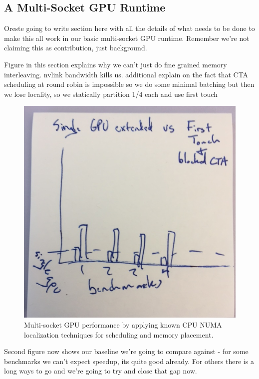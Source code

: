\subsection{A Multi-Socket GPU Runtime}

Oreste going to write section here with all the details of what needs to be done
to make this all work in our basic multi-socket GPU runtime.  Remember we're not
claiming this as contribution, just background.

Figure in this section explains why we can't just do fine grained memory interleaving.
nvlink bandwidth kills us.  additional explain on the fact that CTA scheduling at round robin
is impossible so we do some minimal batching but then we lose locality, so we statically
partition 1/4 each and use first touch

\begin{figure}[tp]
    \centering
    \includegraphics[width=0.9\columnwidth]{figures/motivation1.jpg}
    \caption{Multi-socket GPU performance by applying known CPU NUMA localization techniques for scheduling and memory placement.}
    \label{fig:motivation}
\end{figure}

Second figure now shows our baseline we're going to compare against - for some benchmarks we can't expect speedup, its quite good already.
For others there is a long ways to go and we're going to try and close that gap now.

